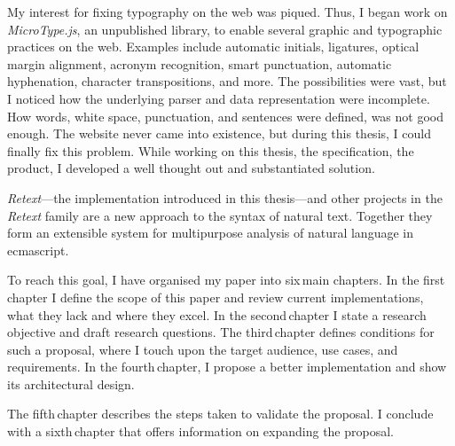 My interest for fixing typography on the web was piqued.
Thus, I began work on \emph{MicroType.js}, an unpublished library, to
  enable several graphic and typographic practices on the web.
Examples include automatic initials, ligatures, optical margin alignment,
  acronym recognition, smart punctuation, automatic hyphenation, character
  transpositions, and more.
The possibilities were vast, but I noticed how the underlying parser and data
  representation were incomplete.
How words, white space, punctuation, and sentences were defined, was not
  good enough.
The website never came into existence, but during this thesis, I could
  finally fix this problem.
While working on this thesis, the specification, the product, I developed a
  well thought out and substantiated solution.

\emph{Retext}---the implementation introduced in this thesis---and other
  projects in the \emph{Retext} family are a new approach to the syntax of
  natural text.
Together they form an extensible system for multipurpose analysis of natural
  language in \gls{ecmascript}.

To reach this goal, I have organised my paper into six\,main chapters.
In the first\,chapter I define the scope of this paper and review current
  implementations, what they lack and where they excel.
In the second\,chapter I state a research objective and draft research
  questions.
The third\,chapter defines conditions for such a proposal, where I touch
  upon the target audience, use cases, and requirements.
In the fourth\,chapter, I propose a better implementation and show its
  architectural design.

The fifth\,chapter describes the steps taken to validate the proposal.
I conclude with a sixth\,chapter that offers information on expanding the
  proposal.

\endgroup
